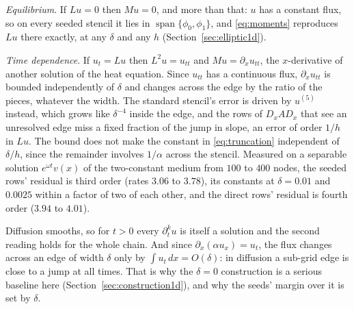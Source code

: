 \documentclass[11pt]{amsart}
\theoremstyle{definition}
\theoremstyle{remark}
\newcommand{\px}{\partial_x}
\newcommand{\pt}{\partial_t}
\newcommand{\para}[1]{\par\smallskip\noindent\textit{#1}.\enspace}
\begin{document}
\para{Equilibrium}
If $L u = 0$ then $M u = 0$, and more than that: $u$ has a constant flux,
so on every seeded stencil it lies in $\operatorname{span}\{\phi_0,
\phi_1\}$, and \eqref{eq:moments} reproduces $L u$ there exactly, at any
$\delta$ and any $h$ (Section~\ref{sec:elliptic1d}).

\para{Time dependence}
If $u_t = L u$ then $L^2 u = u_{tt}$ and $M u = \px u_{tt}$, the
$x$-derivative of another solution of the heat equation. Since $u_{tt}$
has a continuous flux, $\px u_{tt}$ is bounded independently of $\delta$
and changes across the edge by the ratio of the pieces, whatever the width.
The standard stencil's error is driven by $u^{(5)}$ instead, which grows
like $\delta^{-4}$ inside the edge, and the rows of $D_x A D_x$ that see an
unresolved edge miss a fixed fraction of the jump in slope, an error of
order $1/h$ in $L u$. The bound does not make the constant in
\eqref{eq:truncation} independent of $\delta / h$, since the remainder
involves $1/\alpha$ across the stencil. Measured on a separable solution
$e^{\omega t} v(x)$ of the two-constant medium from $100$ to $400$ nodes, the
seeded rows' residual is third order (rates $3.06$ to $3.78$), its
constants at $\delta = 0.01$ and $0.0025$ within a factor of two of each
other, and the direct rows' residual is fourth order ($3.94$ to
$4.01$).

Diffusion smooths, so for $t > 0$ every $\pt^k u$ is itself a solution and
the second reading holds for the whole chain. And since
$\px (\alpha u_x) = u_t$, the flux changes across an edge of width $\delta$
only by $\int u_t\, dx = O(\delta)$: in diffusion a sub-grid edge is close
to a jump at all times. That is why the $\delta = 0$ construction is a
serious baseline here (Section~\ref{sec:construction1d}), and why the
seeds' margin over it is set by $\delta$.
\end{document}
